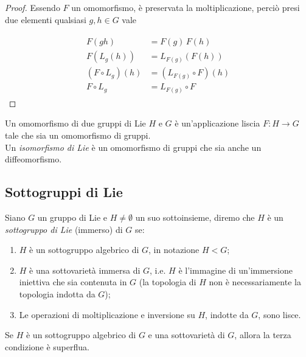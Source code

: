 \begin{proof}
	Essendo $ F $ un omomorfismo, è preservata la moltiplicazione, perciò presi due elementi qualsiasi $ g,h \in G $ vale
	
	\begin{align}
		\begin{split}
			F(g h) &= F(g) \, F(h) \\
			F(L_{g}(h)) &= L_{F(g)}(F(h)) \\
			(F \circ L_{g})(h) &= (L_{F(g)} \circ F)(h) \\
			F \circ L_{g} &= L_{F(g)} \circ F
		\end{split}
	\end{align}
\end{proof}

Un omomorfismo di due gruppi di Lie $ H $ e $ G $ è un'applicazione liscia $ F : H \to G $ tale che sia un omomorfismo di gruppi.\\
Un \textit{isomorfismo di Lie} è un omomorfismo di gruppi che sia anche un diffeomorfismo.

\subsection{Sottogruppi di Lie}

Siano $ G $ un gruppo di Lie e $ H \neq \emptyset $ un suo sottoinsieme, diremo che $ H $ è un \textit{sottogruppo di Lie} (immerso) di $ G $ se:

\begin{enumerate}
	\item $ H $ è un sottogruppo algebrico di $ G $, in notazione $ H < G $;
	
	\item $ H $ è una sottovarietà immersa di $ G $, i.e. $ H $ è l'immagine di un'immersione iniettiva che sia contenuta in $ G $ (la topologia di $ H $ non è necessariamente la topologia indotta da $ G $);
	
	\item Le operazioni di moltiplicazione e inversione su $ H $, indotte da $ G $, sono lisce.
\end{enumerate}

\begin{definition}\label{prop:lie-group-cond}
	Se $ H $ è un sottogruppo algebrico di $ G $ e una sottovarietà di $ G $, allora la terza condizione è superflua.
\end{definition}


